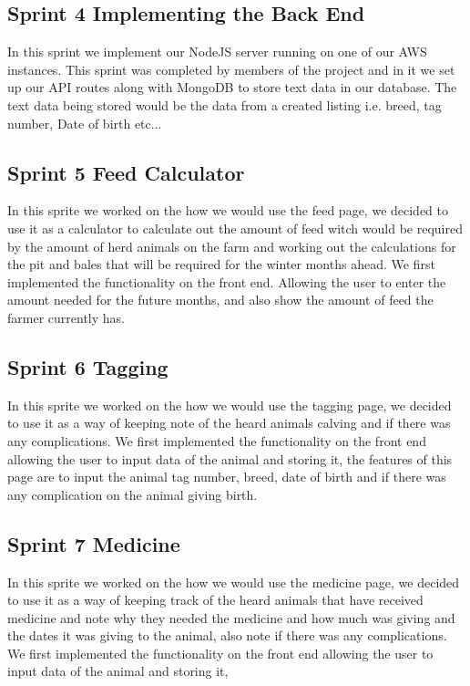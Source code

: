 \documentclass[12pt,a4paper,oneside,openany]{book}
\begin{document}
\subsection{Sprint 4 Implementing the Back End}
In this sprint we implement our NodeJS server running on one of our AWS instances. This sprint was completed by members of the project and in it we set up our API routes along with MongoDB to store text data in our database. The text data being stored would be the data from a created listing i.e. breed, tag number, Date of birth etc...

\subsection{Sprint 5 Feed Calculator}
In this sprite we worked on the how we would use the feed page, we decided to use it as a calculator to calculate out the amount of feed witch would be required by the amount of herd animals on the farm and working out the calculations for the pit and bales that will be required for the winter months ahead. We first implemented the functionality on the front end. Allowing the user to enter the amount needed for the future months, and also show the amount of feed the farmer currently has.

\subsection{Sprint 6 Tagging}
In this sprite we worked on the how we would use the tagging page, we decided to use it as a way of keeping note of the heard animals calving and if there was any complications. We first implemented the functionality on the front end allowing the user to input data of the animal and storing it, the features of this page are to input the animal tag number, breed, date of birth and if there was any complication on the animal giving birth. 

\subsection{Sprint 7 Medicine}
In this sprite we worked on the how we would use the medicine page, we decided to use it as a way of keeping track of the heard animals that have received medicine and note why they needed the medicine and how much was giving and the dates it was giving to the animal, also note if there was any complications. We first implemented the functionality on the front end allowing the user to input data of the animal and storing it,
\end{document}
